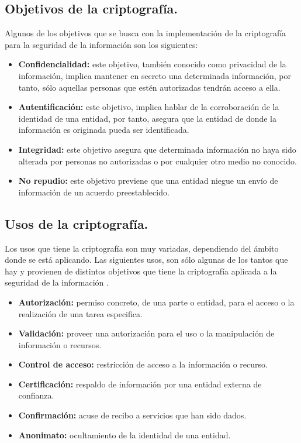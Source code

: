 \documentclass[12pt, a4paper, titlepage]{report}
\begin{document}
            \subsection{Objetivos de la criptografía.}
                Algunos de los objetivos que se busca con la implementación de la criptografía para la seguridad de la información son los siguientes:
                \begin{itemize}
                    \item \textbf{Confidencialidad:} este objetivo, también conocido como privacidad de la información, implica mantener en secreto una determinada información, por tanto, sólo aquellas personas que estén autorizadas tendrán acceso a ella.
                    \item \textbf{Autentificación:} este objetivo, implica hablar de la corroboración de la identidad de una entidad, por tanto, asegura que la entidad de donde la información es originada pueda ser identificada.
                    \item \textbf{Integridad:} este objetivo asegura que determinada información no haya sido alterada por personas no autorizadas o por cualquier otro medio no conocido.
                    \item \textbf{No repudio:} este objetivo previene que una entidad niegue un envío de información de un acuerdo preestablecido.
                \end{itemize}
            \subsection{Usos de la criptografía.}
                Los usos que tiene la criptografía son muy variadas, dependiendo del ámbito donde se está aplicando. Las siguientes usos, son sólo algunas de los tantos que hay y provienen de distintos objetivos que tiene la criptografía aplicada a la seguridad de la información \cite{refCriptografia}.
                \begin{itemize}
                    \item \textbf{Autorización:} permiso concreto, de una parte o entidad, para el acceso o la realización de una tarea especifica.
                    \item \textbf{Validación:} proveer una autorización para el uso o la manipulación de información o recursos.
                    \item \textbf{Control de acceso:} restricción de acceso a la información o recurso.
                    \item \textbf{Certificación:} respaldo de información por una entidad externa de confianza.
                    \item \textbf{Confirmación:} acuse de recibo a servicios que han sido dados.
                    \item \textbf{Anonimato:} ocultamiento de la identidad de una entidad.
                \end{itemize}
                
\end{document}
